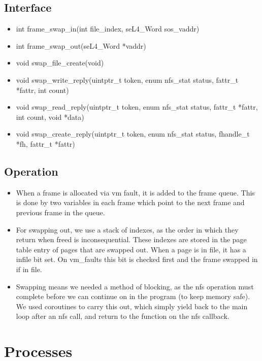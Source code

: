 \documentclass[12pt]{article}
\begin{document}
\subsection{Interface}
\begin{itemize}
\item int frame\_swap\_in(int file\_index, seL4\_Word sos\_vaddr)
\item int frame\_swap\_out(seL4\_Word *vaddr)
\item void swap\_file\_create(void)
\item void swap\_write\_reply(uintptr\_t token, enum nfs\_stat status, fattr\_t *fattr, int count)
\item void swap\_read\_reply(uintptr\_t token, enum nfs\_stat status, fattr\_t *fattr, int count, void *data)
\item void swap\_create\_reply(uintptr\_t token, enum nfs\_stat status, fhandle\_t *fh, fattr\_t *fattr)
\end{itemize}
\subsection{Operation}
\begin{itemize}
\item When a frame is allocated via vm fault, it is added to the frame queue. This is
done by two variables in each frame which point to the next frame and previous
frame in the queue.

\item For swapping out, we use a stack of indexes, as the order in which they return
when freed is inconsequential. These indexes are stored in the page table entry
of pages that are swapped out. When a page is in file, it has a infile bit set. On vm\_faults this bit is checked first and the frame swapped in if in file.

\item Swapping means we needed a method of blocking, as the nfs operation must complete before we can continue on in the program (to keep memory safe).
We used coroutines to carry this out, which simply yield back to the main loop after an nfs call, and return to the function on the nfs callback.
\end{itemize}

\clearpage
\section{Processes}
\end{document}
